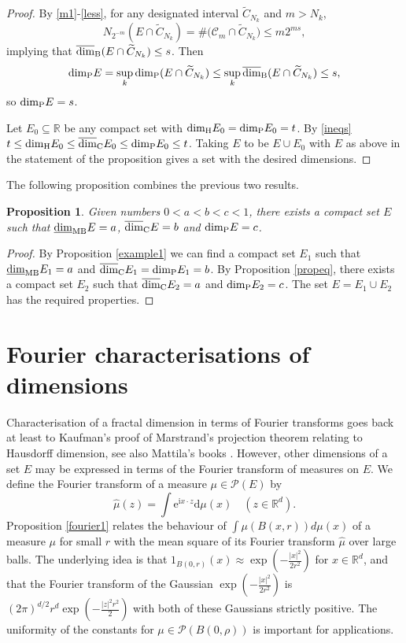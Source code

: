 \documentclass[12pt]{article}
\newcommand{\1}{{\bf 1}}
\newcommand\ucod{\overline{\mbox{\rm dim}}_{\rm C}} %
\newcommand\ubd{\overline{\mbox{\rm dim}}_{\rm B}} %
\newcommand\pkd{\mbox{\rm dim}_{\rm P}} %
\newcommand\hdd{\mbox{\rm dim}_{\rm H}} %
\newcommand\mlbd{\underline{\mbox{\rm dim}}_{\rm MB}} %
\newcommand{\R}{\mathbb{R}}
\newtheorem{prop}[theo]{Proposition}
\begin{document}
\begin{proof}
		By \eqref{m1}-\eqref{less}, for any designated interval $\widetilde{C}_{N_k}$ and $m>N_k$,
	\begin{equation*}
		N_{2^{-m}}(E\cap\widetilde{C}_{N_k})=\#\big(\mathcal{C}_m\cap \widetilde{C}_{N_k}\big)\leq m 2^{ms},
	\end{equation*}
	implying that $\ubd (E\cap\widetilde{C}_{N_k})\leq s$.
	Then
	\begin{equation*}
		\pkd  E=\sup_k \pkd (E\cap\widetilde{C}_{N_k})\leq\sup_k \ubd(E\cap\widetilde{C}_{N_k})\leq s,
	\end{equation*}	
	so	$\pkd  E=s$.

	Let $E_0\subseteq\R$ be any compact set with $\hdd E_0 = \pkd  E_0 =t$. By \eqref{ineqs}
	$t\leq \hdd E_0 \leq  \ucod E_0\leq \pkd  E_0\leq t $.
	 Taking $E$ to be $E\cup E_0$ with $E$ as above in the statement of the proposition gives a set with the desired dimensions.
	\end{proof}

The following proposition combines the previous two results.

\begin{prop}
	Given numbers $0<a<b<c<1$, there exists a compact set $E$ such that $\mlbd E  = a$, $\ucod E=b$ and $\pkd E=c$.
\end{prop}
\begin{proof}
By Proposition \ref{example1} we can find a compact set $E_1$ such that $\mlbd E_1=a$ and $\ucod E_1=\pkd E_1=b$.
By Proposition \ref{propeq}, there exists a compact set $E_2$ such that $\ucod E_2=a$ and $\pkd E_2=c$. The set $E=E_1\cup E_2$ has the required properties.
\end{proof}



\section{Fourier characterisations of dimensions}\label{FourierSec}
\setcounter{equation}{0}
\setcounter{theo}{0}

Characterisation of a fractal dimension in terms of Fourier transforms goes back at least to Kaufman's \cite{Kau} proof of Marstrand's  projection theorem relating to Hausdorff dimension, see also Mattila's books \cite{Mat, Mat2}. However, other dimensions of a set $E$ may be expressed in terms of the Fourier transform of measures on $E$. We define the Fourier transform of a measure  $\mu \in {\mathcal P}(E)$ by 
$$\widehat {\mu}(z) = \int \mathrm{e}^{\mathrm{i}x\cdot z} \mathrm{d}\mu(x)\quad (z\in \mathbb{R}^d).$$
Proposition \ref{fourier1}  relates the behaviour of $\int \mu(B(x,r))d\mu(x)$ of a measure $\mu$ for small $r$ with the mean square of its Fourier transform $\widehat {\mu}$  over large balls. The underlying idea is that $1_{B(0,r)} (x)\approx \exp(-\frac{|x|^2}{2r^2})$ for $x\in \mathbb{R}^d$, and that the  Fourier transform of the Gaussian $\exp(-\frac{|x|^2}{2r^2})$ is $(2\pi)^{d/2} r^d \exp(-\frac{|z|^2 r^2}{2})$ with both of these Gaussians strictly positive. The uniformity of the constants for $\mu \in \mathcal{P}(B(0,\rho))$ is important for applications. 
\end{document}
